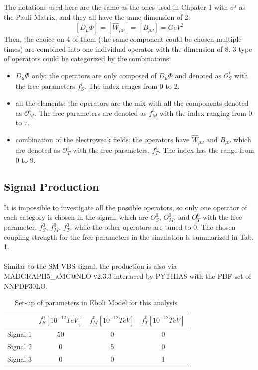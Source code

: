 The notations used here are the same as the ones used in Chpater 1 with $\sigma^j$ as the Pauli Matrix, and they all have the same dimension of 2:
\begin{equation}
\left[D_{\mu}\Phi\right]=\left[\hat{W}_{\mu\nu}\right]=\left[B_{\mu\nu}\right]= GeV^2
\end{equation}
Then, the choice on 4 of them (the same component could be chosen multiple times) are combined into one individual operator with the dimension of 8. 3 type of operators could be categorized by the combinations:
\begin{itemize}
    \item{$D_\mu\Phi$ only}: the operators are only composed of $D_\mu\Phi$ and denoted as $\mathcal{O}^i_S$ with the free parameters $f^i_{S}$. The index ranges from 0 to 2.  
    \item{all the elements}: the operators are the mix with all the components denoted as  $\mathcal{O}^i_M$. The free parameters are denoted as $f^i_{M}$ with the index ranging from 0 to 7.
    \item{combination of the electroweak fields}: the operators have $\hat{W}_{\mu\nu}$ and $B_{\mu\nu}$ which are denoted as $\mathcal{O}_{T}^i$ with the free parameters, $f_T^i$. The index has the range from 0 to 9. 
\end{itemize}
\noindent
\subsection{Signal Production}
It is impossible to investigate all the possible operators, so only one operator of each category is chosen in the signal, which are $O_{S}^0$, $O_{M}^0$, and $O_{T}^0$ with the free parameter, $f^0_{S}$, $f^0_{M}$,  $f_T^0$, while the other operators are tuned to 0.  The chosen coupling strength for the free parameters in the simulation is summarized in Tab. \ref{Tab:Eboli}.
\\
\\Similar to the SM VBS signal, the production is also via \textsc{MADGRAPH5\_aMC@NLO v2.3.3} interfaced by \textsc{PYTHIA8} with the PDF set of NNPDF30LO. 
\begin{table}[h]
	\caption{Set-up of parameters in Eboli Model for this analysis} \label{Tab:Eboli}
	\begin{center}
		\begin{tabular}{ | c | c | c | c | }
		\hline
			     &   $f^0_{S}\left[10^{-12}TeV\right]$  & $f^0_{M}\left[10^{-12}TeV\right]$ & $f^0_{T}\left[10^{-12}TeV\right]$ \\
	    \hline
	    Signal 1 &        50                            & 0                                & 0 \\
	    \hline
		Signal 2 &        0                             & 5                                & 0 \\
		\hline
		Signal 3 &        0                             & 0                                & 1 \\
		\hline
		\end{tabular}
	\end{center}
\end{table}
\noindent
